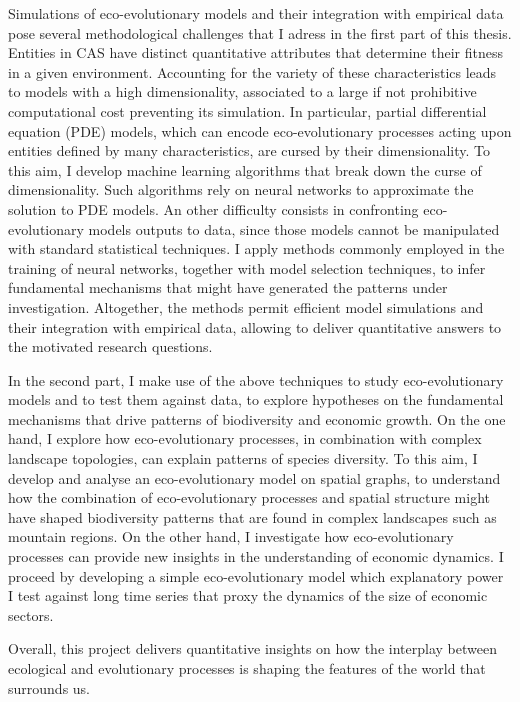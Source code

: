 Simulations of eco-evolutionary models and their integration with empirical data pose several methodological challenges that I adress in the first part of this thesis. Entities in CAS have distinct quantitative attributes that determine their fitness in a given environment. Accounting for the variety of these characteristics leads to models with a high dimensionality, associated to a large if not prohibitive computational cost preventing its simulation. In particular, partial differential equation (PDE) models, which can encode eco-evolutionary processes acting upon entities defined by many characteristics, are cursed by their dimensionality. To this aim, I develop machine learning algorithms that break down the curse of dimensionality. Such algorithms rely on neural networks to approximate the solution to PDE models. An other difficulty consists in confronting eco-evolutionary models outputs to data, since those models cannot be manipulated with standard statistical techniques. I apply methods commonly employed in the training of neural networks, together with model selection techniques, to infer fundamental mechanisms that might have generated the patterns under investigation. Altogether, the methods permit efficient model simulations and their integration with empirical data, allowing to deliver quantitative answers to the motivated research questions.

In the second part, I make use of the above techniques to study eco-evolutionary models and to test them against data, to explore hypotheses on the fundamental mechanisms that drive patterns of biodiversity and economic growth. On the one hand, I explore how eco-evolutionary processes, in combination with complex landscape topologies, can explain patterns of species diversity. To this aim, I develop and analyse an eco-evolutionary model on spatial graphs, to understand how the combination of eco-evolutionary processes and spatial structure might have shaped biodiversity patterns that are found in complex landscapes such as mountain regions. 
% 
On the other hand, I investigate how eco-evolutionary processes can provide new insights in the understanding of economic dynamics. I proceed by developing a simple eco-evolutionary model which explanatory power I test against long time series that proxy the dynamics of the size of economic sectors. 

Overall, this project delivers quantitative insights on how the interplay between ecological and evolutionary processes is shaping the features of the world that surrounds us.


